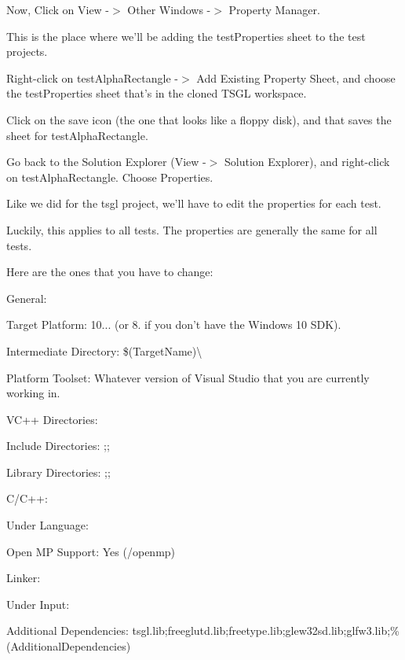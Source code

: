Now, Click on View -\/$>$ Other Windows -\/$>$ Property Manager.

This is the place where we'll be adding the test\-Properties sheet to the test projects.

Right-\/click on test\-Alpha\-Rectangle -\/$>$ Add Existing Property Sheet, and choose the test\-Properties sheet that's in the cloned T\-S\-G\-L workspace.

Click on the save icon (the one that looks like a floppy disk), and that saves the sheet for test\-Alpha\-Rectangle.

Go back to the Solution Explorer (View -\/$>$ Solution Explorer), and right-\/click on test\-Alpha\-Rectangle. Choose Properties.

Like we did for the tsgl project, we'll have to edit the properties for each test.

Luckily, this applies to all tests. The properties are generally the same for all tests.

Here are the ones that you have to change\-:

General\-:


\begin{DoxyItemize}
\item Target Platform\-: 10... (or 8. if you don't have the Windows 10 S\-D\-K).
\item Intermediate Directory\-: \$(Target\-Name)\textbackslash{}
\item Platform Toolset\-: Whatever version of Visual Studio that you are currently working in.
\end{DoxyItemize}

V\-C++ Directories\-:


\begin{DoxyItemize}
\item Include Directories\-: ;;
\item Library Directories\-: ;;
\end{DoxyItemize}

C/\-C++\-:


\begin{DoxyItemize}
\item Under Language\-:
\begin{DoxyItemize}
\item Open M\-P Support\-: Yes (/openmp)
\end{DoxyItemize}
\end{DoxyItemize}

Linker\-:


\begin{DoxyItemize}
\item Under Input\-:
\begin{DoxyItemize}
\item Additional Dependencies\-: tsgl.\-lib;freeglutd.\-lib;freetype.\-lib;glew32sd.\-lib;glfw3.\-lib;\%(Additional\-Dependencies)
\end{DoxyItemize}
\end{DoxyItemize}

